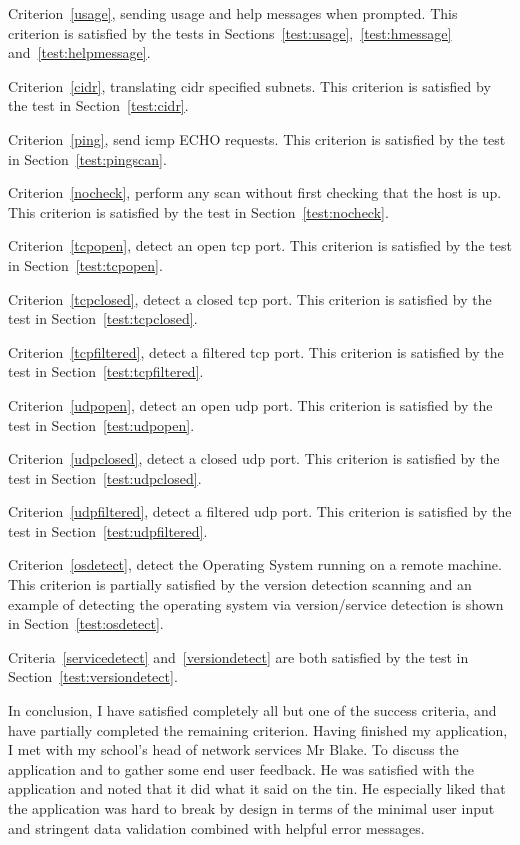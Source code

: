 \documentclass[titlepage]{article}
\begin{document}
Criterion~\ref{usage}, sending usage and help messages when prompted.
This criterion is satisfied by the tests in Sections~\ref{test:usage},~\ref{test:hmessage} and~\ref{test:helpmessage}.

Criterion~\ref{cidr}, translating \gls{cidr} specified subnets.
This criterion is satisfied by the test in Section~\ref{test:cidr}.

Criterion~\ref{ping}, send \gls{icmp} ECHO requests.
This criterion is satisfied by the test in Section~\ref{test:pingscan}.

Criterion~\ref{nocheck}, perform any scan without first checking that the host is up.
This criterion is satisfied by the test in Section~\ref{test:nocheck}.

Criterion~\ref{tcpopen}, detect an open \gls{tcp} port.
This criterion is satisfied by the test in Section~\ref{test:tcpopen}.

Criterion~\ref{tcpclosed}, detect a closed \gls{tcp} port.
This criterion is satisfied by the test in Section~\ref{test:tcpclosed}.

Criterion~\ref{tcpfiltered}, detect a filtered \gls{tcp} port.
This criterion is satisfied by the test in Section~\ref{test:tcpfiltered}.

Criterion~\ref{udpopen}, detect an open \gls{udp} port.
This criterion is satisfied by the test in Section~\ref{test:udpopen}.

Criterion~\ref{udpclosed}, detect a closed \gls{udp} port.
This criterion is satisfied by the test in Section~\ref{test:udpclosed}.

Criterion~\ref{udpfiltered}, detect a filtered \gls{udp} port.
This criterion is satisfied by the test in Section~\ref{test:udpfiltered}.

Criterion~\ref{osdetect}, detect the Operating System running on a remote machine.
This criterion is partially satisfied by the version detection scanning and
an example of detecting the operating system via version/service detection is shown
in Section~\ref{test:osdetect}.

Criteria~\ref{servicedetect} and~\ref{versiondetect} are both satisfied
by the test in Section~\ref{test:versiondetect}.

In conclusion, I have satisfied completely all but one of the success criteria, and have partially
completed the remaining criterion.
Having finished my application, I met with my school's head of network services Mr Blake.
To discuss the application and to gather some end user feedback.
He was satisfied with the application and noted that it did what it said on the tin.
He especially liked that the application was hard to break by design in terms of
the minimal user input and stringent data validation combined with helpful error messages.
\end{document}
